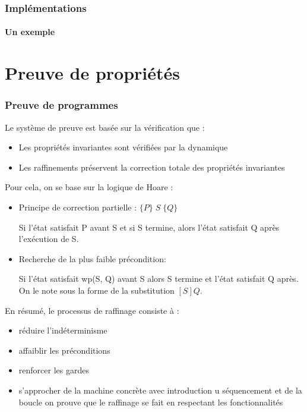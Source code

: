 \documentclass[11pt,a4paper,xcolor=table]{beamer} %
\begin{document}
\begin{frame}
\frametitle{Implémentations}
\framesubtitle{Un exemple}
\end{frame}

\section{Preuve de propriétés}
\begin{frame}
\frametitle{Preuve de programmes}
Le système de preuve est basée sur la vérification que :
\begin{itemize}
\item Les propriétés invariantes sont vérifiées par la
dynamique
\item Les raffinements préservent la correction totale
des propriétés invariantes
\end{itemize}

\pause
Pour cela, on se base sur la logique de Hoare :
\begin{itemize}
\item
Principe de correction partielle : $ \{P\}\;S\;\{Q\} $ 

Si l'état satisfait P avant S et si S termine, alors l'état satisfait Q après l'exécution de S.
\item
Recherche de la plus faible précondition:

Si l'état satisfait wp(S, Q) avant S alors S termine et l'état satisfait Q après.
On le note sous la forme de la substitution $[S]Q$.
\end{itemize}
\end{frame}

\begin{frame}
En résumé, le processus de raffinage consiste à :
\begin{itemize}
\item réduire l'indéterminisme
\item affaiblir les préconditions
\item renforcer les gardes
\item s'approcher de la machine concrète avec introduction u séquencement et de la boucle
on prouve que le raffinage se fait en respectant les fonctionnalités
\end{itemize}
\end{frame}


\iffalse
\end{document}
